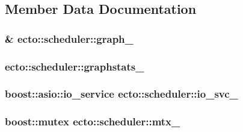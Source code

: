 \subsection{\-Member \-Data \-Documentation}
\hypertarget{classecto_1_1scheduler_a79de9623f94d1003dc34f12fc69c5981}{
\subsubsection[{graph\-\_\-}]{\& {\bf ecto\-::scheduler\-::graph\-\_\-}}}\label{classecto_1_1scheduler_a79de9623f94d1003dc34f12fc69c5981}
\hypertarget{classecto_1_1scheduler_a6da29ce8fc4f4d2a1c451a577e049c62}{
\subsubsection[{graphstats\-\_\-}]{ {\bf ecto\-::scheduler\-::graphstats\-\_\-}}}\label{classecto_1_1scheduler_a6da29ce8fc4f4d2a1c451a577e049c62}
\hypertarget{classecto_1_1scheduler_af8f90a97a59811157c657cecb8512069}{
\subsubsection[{io\-\_\-svc\-\_\-}]{\setlength{\rightskip}{0pt plus 5cm}boost\-::asio\-::io\-\_\-service {\bf ecto\-::scheduler\-::io\-\_\-svc\-\_\-}}}\label{classecto_1_1scheduler_af8f90a97a59811157c657cecb8512069}
\hypertarget{classecto_1_1scheduler_a47a29f5a0e1f1ab8ce816b0c63442b5c}{
\subsubsection[{mtx\-\_\-}]{\setlength{\rightskip}{0pt plus 5cm}boost\-::mutex {\bf ecto\-::scheduler\-::mtx\-\_\-}}}\label{classecto_1_1scheduler_a47a29f5a0e1f1ab8ce816b0c63442b5c}
